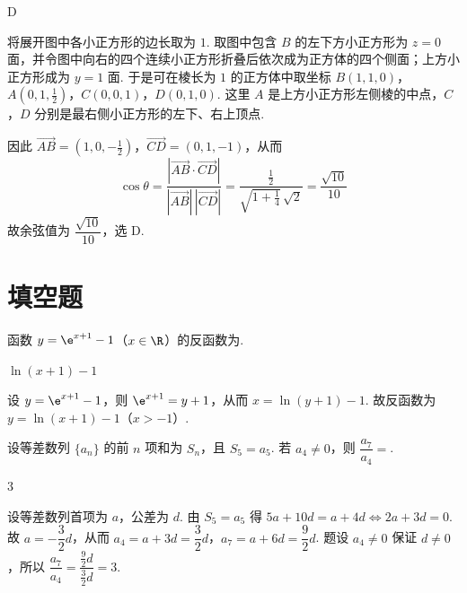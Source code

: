 \begin{answer}
D
\end{answer}

\begin{solution}
将展开图中各小正方形的边长取为 \(1\). 取图中包含 \(B\) 的左下方小正方形为 \(z=0\) 面，并令图中向右的四个连续小正方形折叠后依次成为正方体的四个侧面；上方小正方形成为 \(y=1\) 面. 于是可在棱长为 \(1\) 的正方体中取坐标
\(B(1,1,0)\)，\(A(0,1,\tfrac12)\)，\(C(0,0,1)\)，\(D(0,1,0)\). 这里 \(A\) 是上方小正方形左侧棱的中点，\(C\)，\(D\) 分别是最右侧小正方形的左下、右上顶点.

因此
\(\overrightarrow{AB}=(1,0,-\tfrac12)\)，\(\overrightarrow{CD}=(0,1,-1)\)，从而
\[
\cos\theta=\frac{|\overrightarrow{AB}\cdot\overrightarrow{CD}|}{|\overrightarrow{AB}|\,|\overrightarrow{CD}|}
=\frac{\frac12}{\sqrt{1+\frac14}\,\sqrt2}
=\frac{\sqrt{10}}{10}
\]
故余弦值为 \(\dfrac{\sqrt{10}}{10}\)，选 D.
\end{solution}

\section{填空题}

\begin{problem}
函数 \(y=\e^{x+1}-1\)（\(x\in \R\)）的反函数为\fillinblank{}.
\end{problem}

\begin{answer}
\(\ln(x+1)-1\)
\end{answer}

\begin{solution}
设 \(y=\e^{x+1}-1\)，则 \(\e^{x+1}=y+1\)，从而 \(x=\ln(y+1)-1\). 故反函数为
\(y=\ln(x+1)-1\)（\(x>-1\)）.
\end{solution}

\begin{problem}
设等差数列 \(\{a_n\}\) 的前 \(n\) 项和为 \(S_n\)，且 \(S_5=a_5\). 若 \(a_4\neq0\)，则 \(\dfrac{a_7}{a_4}=\)\fillinblank{}.
\end{problem}

\begin{answer}
\(3\)
\end{answer}

\begin{solution}
设等差数列首项为 \(a\)，公差为 \(d\). 由 \(S_5=a_5\) 得
\(5a+10d=a+4d\iff 2a+3d=0\).
故 \(a=-\dfrac32d\)，从而
\(a_4=a+3d=\dfrac32d\)，\(a_7=a+6d=\dfrac92d\).
题设 \(a_4\ne0\) 保证 \(d\ne0\)，所以
\(\dfrac{a_7}{a_4}=\dfrac{\frac92d}{\frac32d}=3\).
\end{solution}

